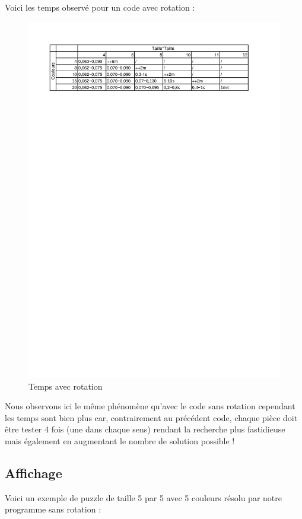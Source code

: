 \documentclass[french]{rapportAlgoM1}
\begin{document}
Voici les temps observé pour un code avec rotation :
\begin{figure}
  \includegraphics[width=\linewidth]{img/TimeR.png}
  \caption{Temps avec rotation}
  \label{img:timeR}
\end{figure}
Nous observons ici le même phénomène qu'avec le code sans rotation cependant les temps sont bien plus car, contrairement au précédent code, chaque pièce doit être tester 4 fois (une dans chaque sens) rendant la recherche plus fastidieuse mais également en augmentant le nombre de solution possible ! 

\subsection*{Affichage}

Voici un exemple de puzzle de taille 5 par 5 avec 5 couleurs résolu
par notre programme sans rotation :
\begin{verbnobox}\fontsize{7pt}{7pt}\selectfont
\end{verbnobox}
\end{document}
